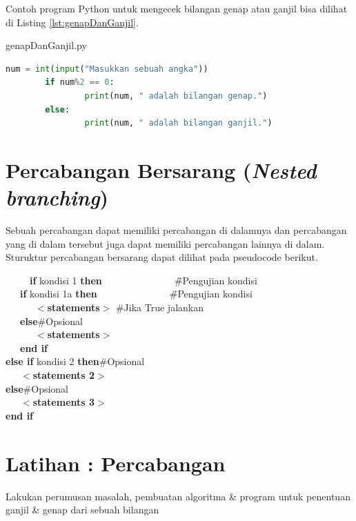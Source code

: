 Contoh program Python untuk mengecek bilangan genap atau ganjil bisa dilihat di Listing \ref{lst:genapDanGanjil}.

\begin{listprog}{genapDanGanjil.py}
	\label{lst:genapDanGanjil}
	\begin{lstlisting}[language=Python]
		num = int(input("Masukkan sebuah angka"))
		if num%2 == 0:
				print(num, " adalah bilangan genap.")
		else:
				print(num, " adalah bilangan ganjil.")
	\end{lstlisting}
\end{listprog}


\section{Percabangan Bersarang (\textit{Nested branching})}
Sebuah percabangan dapat memiliki percabangan di dalamnya dan percabangan yang di dalam tersebut juga dapat memiliki percabangan lainnya di dalam. Sturuktur percabangan bersarang dapat dilihat pada pseudocode berikut.

\begin{tabbing}
~~~~~\=\textbf{if} kondisi 1 \textbf{then}~~~~~~~~~~~~~~~\=\#Pengujian kondisi\\
\>~~~\textbf{if} kondisi 1a \textbf{then}~~~~~~~~~~~~~~~\=\#Pengujian kondisi\\
\>~~~~~~$<$\textbf{statements}$>$ \> \#Jika True jalankan\\
\>~~~\textbf{else}\>\#Opsional\\
\>~~~~~~$<$\textbf{statements}$>$\>\\
\>~~~\textbf{end if}\\
\>\textbf{else if } kondisi 2 \textbf{then}\>\#Opsional\\
\>~~~$<$\textbf{statements 2}$>$\>\\
\>\textbf{else}\>\#Opsional\\
\>~~~$<$\textbf{statements 3}$>$\>\\
\>\textbf{end if}
\end{tabbing}


\section{Latihan : Percabangan}

\begin{pemrograman}
Lakukan perumusan masalah, pembuatan algoritma \& program untuk penentuan ganjil \& genap dari sebuah bilangan\end{pemrograman}

